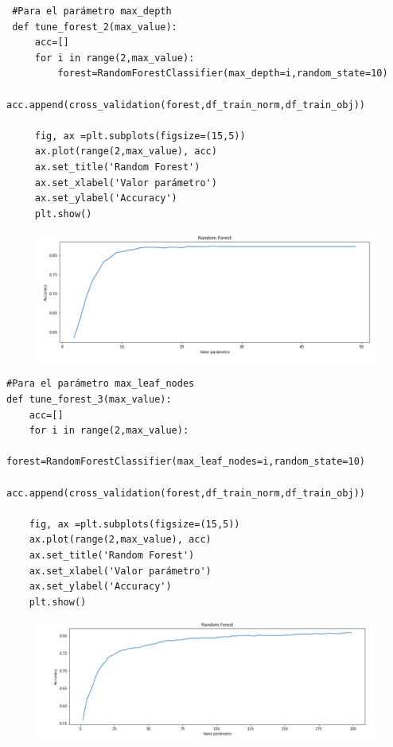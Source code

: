 \documentclass[a4paper,11pt]{article}
\begin{document}
 \begin{verbatim}
 #Para el parámetro max_depth
 def tune_forest_2(max_value):
	 acc=[]
	 for i in range(2,max_value):
		 forest=RandomForestClassifier(max_depth=i,random_state=10)
		 acc.append(cross_validation(forest,df_train_norm,df_train_obj))
	 
	 fig, ax =plt.subplots(figsize=(15,5))
	 ax.plot(range(2,max_value), acc)
	 ax.set_title('Random Forest')
	 ax.set_xlabel('Valor parámetro')
	 ax.set_ylabel('Accuracy')
	 plt.show()
 \end{verbatim}
 \begin{figure}[H]
 	\centering
 	\includegraphics[width=0.7\linewidth]{img/forest2}
 	\caption{}
 	\label{fig:forest2}
 \end{figure}
 
 \begin{verbatim}
#Para el parámetro max_leaf_nodes
def tune_forest_3(max_value):
	acc=[]
	for i in range(2,max_value):
		forest=RandomForestClassifier(max_leaf_nodes=i,random_state=10)
		acc.append(cross_validation(forest,df_train_norm,df_train_obj))
		
	fig, ax =plt.subplots(figsize=(15,5))
	ax.plot(range(2,max_value), acc)
	ax.set_title('Random Forest')
	ax.set_xlabel('Valor parámetro')
	ax.set_ylabel('Accuracy')
	plt.show()
 \end{verbatim}

 \begin{figure}[H]
 	\centering
 	\includegraphics[width=0.7\linewidth]{img/forest3}
 	\caption{}
 	\label{fig:forest3}
 \end{figure}
 
\end{document}
